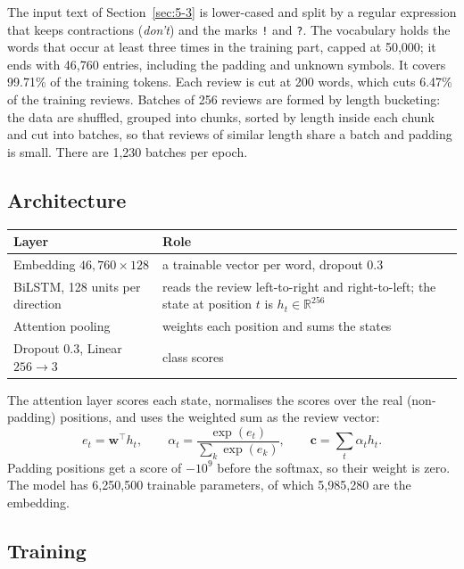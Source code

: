 The input text of Section~\ref{sec:5-3} is lower-cased and split by a regular expression that keeps contractions (\emph{don't}) and the marks \texttt{!} and \texttt{?}. The vocabulary holds the words that occur at least three times in the training part, capped at 50{,}000; it ends with 46{,}760 entries, including the padding and unknown symbols. It covers 99.71\% of the training tokens. Each review is cut at 200 words, which cuts 6.47\% of the training reviews. Batches of 256 reviews are formed by length bucketing: the data are shuffled, grouped into chunks, sorted by length inside each chunk and cut into batches, so that reviews of similar length share a batch and padding is small. There are 1{,}230 batches per epoch.

\subsection*{Architecture}

\begin{center}
\begin{tabular}{@{}p{3.6cm}p{10.4cm}@{}}
    \toprule
    Layer & Role \\
    \midrule
    Embedding $46{,}760\times128$ & a trainable vector per word, dropout 0.3 \\
    BiLSTM, 128 units per direction & reads the review left-to-right and right-to-left; the state at position $t$ is $h_t\in\mathbb{R}^{256}$ \\
    Attention pooling & weights each position and sums the states \\
    Dropout 0.3, Linear $256\to3$ & class scores \\
    \bottomrule
\end{tabular}
\end{center}

The attention layer scores each state, normalises the scores over the real (non-padding) positions, and uses the weighted sum as the review vector:
\begin{equation*}
    e_t = \mathbf{w}^\top h_t,\qquad
    \alpha_t = \frac{\exp(e_t)}{\sum_k \exp(e_k)},\qquad
    \mathbf{c} = \sum_t \alpha_t h_t .
\end{equation*}
Padding positions get a score of $-10^{9}$ before the softmax, so their weight is zero. The model has 6{,}250{,}500 trainable parameters, of which 5{,}985{,}280 are the embedding.

\subsection*{Training}

